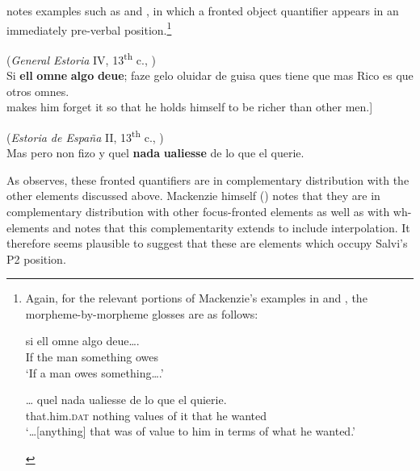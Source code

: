 \documentclass[output=paper]{LSP/langsci}
\begin{document}
\citet{Mackenzie2010} notes examples such as  and , in which a fronted object quantifier appears in an immediately pre-verbal position.\footnote{Again, for the relevant portions of Mackenzie’s examples in  and , the morpheme-by-morpheme glosses are as follows:

\let\eachwordone=\upshape
\begin{exe}
 \gll si ell omne algo deue….\\
      If the man something owes\\
 \glt ‘If a man owes something….’
\end{exe}

\let\eachwordone=\upshape
\begin{exe}
\gll … quel nada ualiesse de lo que el quierie.\\
     {} that.him.\textsc{dat} nothing values of it that he wanted\\
\glt ‘…[anything] that was of value to him in terms of what he wanted.’
\end{exe} 
}  

\ea%
    \label{ex:poole:14}(\textit{General Estoria} IV, 13\textsuperscript{th} c., \citealt[(22)]{Mackenzie2010})\\
    Si \textbf{ell} \textbf{omne} \textbf{algo} \textbf{deue}; faze gelo oluidar de guisa ques tiene que mas Rico es que otros omnes.\\
    \glt[If a man owes something, it [wine] makes him forget it so that he holds himself to be richer than other men.]
    \z

\ea%
    \label{ex:poole:15}(\textit{Estoria de España} II, 13\textsuperscript{th} c., \citealt[(23)]{Mackenzie2010})\\
    Mas pero non fizo y quel \textbf{nada} \textbf{ualiesse} de lo que el querie.   

    \z

\noindent As \citet{Poole2016} observes, these fronted quantifiers are in complementary distribution with the other elements discussed above.  Mackenzie himself (\citeyear[392]{Mackenzie2010}) notes that they are in complementary distribution with other focus-fronted elements as well as with wh-elements and \citet{Poole2016} notes that this complementarity extends to include interpolation.  It therefore seems plausible to suggest that these are elements which occupy Salvi’s P2 position.
\end{document}
